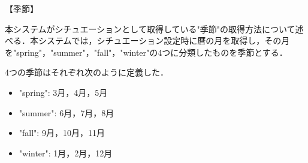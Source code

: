 【季節】
\par 本システムがシチュエーションとして取得している"季節"の取得方法について述べる．本システムでは，シチュエーション設定時に暦の月を取得し，その月を"spring"，"summer"，"fall"，"winter"の4つに分類したものを季節とする．
\par 4つの季節はそれぞれ次のように定義した．
\begin{itemize}
 \item "spring": 3月，4月，5月
 \item "summer": 6月，7月，8月
 \item "fall": 9月，10月，11月
 \item "winter": 1月，2月，12月
\end{itemize}
